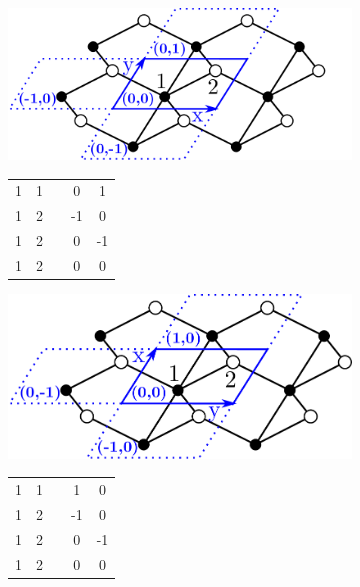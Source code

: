 \documentclass[main.tex]{subfiles}
\begin{document}
\begin{figure}[t]
	\begin{subfigure}[b]{0.35\linewidth}
		\hspace{-1.5em}\includegraphics[width=0.96\linewidth]{figures/topology/cells_ref.pdf}
		\label{fig:periodiccells_ref}
		
		\centering\begin{tabular}{ccccc}
			1&1&&0&1\\
			1&2&&-1&0\\
			1&2&&0&-1\\
			1&2&&0&0
		\end{tabular}
		
	\end{subfigure}%
	\begin{subfigure}[b]{0.35\linewidth}
		\hspace{-1.5em}\includegraphics[width=0.9\linewidth]{figures/topology/cells_xy.pdf}
		
		\centering\begin{tabular}{ccccc}
			1&1&&1&0\\
			1&2&&-1&0\\
			1&2&&0&-1\\
			1&2&&0&0
		\end{tabular}
		

\end{subfigure}
\end{figure}
\end{document}
